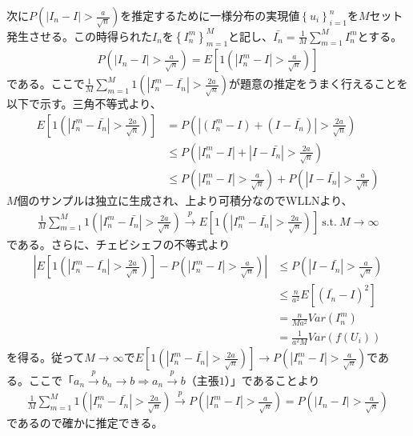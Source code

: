 \documentclass{article}
\begin{document}
次に$P\left( | I_n - I | > \frac{a}{\sqrt{n}} \right)$を推定するために一様分布の実現値$\left\{ u_i \right\}_{i=1}^n$を$M$セット発生させる。この時得られた$I_n$を$\left\{I_n^m\right\}_{m=1}^M$と記し、$\bar{I_n} = \frac{1}{M} \sum_{m=1}^M I_n^m$とする。
\begin{align*}
	P\left( | I_n - I | > \frac{a}{\sqrt{n}} \right) = E\left[ 1\left(  | I_n^m - I | > \frac{a}{\sqrt{n}} \right) \right]
\end{align*}
である。ここで$\frac{1}{M} \sum_{m=1}^M 1\left(  | I_n^m - \bar{I_n} | > \frac{2a}{\sqrt{n}} \right)$が題意の推定をうまく行えることを以下で示す。三角不等式より、
\begin{align*}
	E\left[ 1\left(  | I_n^m - \bar{I_n} | > \frac{2a}{\sqrt{n}} \right) \right] &= P\left( | (I_n^m - I) + (I - \bar{I_n}) |  > \frac{2a}{\sqrt{n}} \right) \\
	&\leq P\left( | I_n^m - I |+ |I - \bar{I_n}|  > \frac{2a}{\sqrt{n}} \right)\\
	& \leq P\left( | I_n^m - I |> \frac{a}{\sqrt{n}} \right) + P\left( |I - \bar{I_n}|  > \frac{a}{\sqrt{n}} \right)
\end{align*}
$M$個のサンプルは独立に生成され、上より可積分なのでWLLNより、
\begin{align*}
\frac{1}{M} \sum_{m=1}^M 1\left(  | I_n^m - \bar{I_n} | > \frac{2a}{\sqrt{n}} \right) \xrightarrow{p} E\left[ 1\left(  | I_n^m - \bar{I_n} | > \frac{2a}{\sqrt{n}} \right) \right]\ \text{s.t.}\ M\to \infty
\end{align*}
である。さらに、チェビシェフの不等式より
\begin{align*}
	\left| E\left[ 1\left(  | I_n^m - \bar{I_n} | > \frac{2a}{\sqrt{n}} \right) \right] - P\left( | I_n^m - I |> \frac{a}{\sqrt{n}} \right)  \right| &\leq P\left( |I - \bar{I_n}|  > \frac{a}{\sqrt{n}} \right)\\
	&\leq \frac{n}{a^2} E\left[ \left( \bar{I_n} - I \right)^2 \right]\\
	&= \frac{n}{Ma^2} Var\left(I_n^m \right)\\
	&= \frac{1}{a^2M} Var\left( f(U_i) \right)
\end{align*}
を得る。従って$M\to \infty$で$E\left[ 1\left(  | I_n^m - \bar{I_n} | > \frac{2a}{\sqrt{n}} \right) \right] \to P\left( | I_n^m - I |> \frac{a}{\sqrt{n}} \right)$である。ここで「$a_n \xrightarrow{p} b_n \to b \Rightarrow a_n \xrightarrow{p} b$（主張$1$）」であることより
\begin{align*}
	\frac{1}{M} \sum_{m=1}^M 1\left(  | I_n^m - \bar{I_n} | > \frac{2a}{\sqrt{n}} \right) \xrightarrow{p} P\left( | I_n^m - I |> \frac{a}{\sqrt{n}} \right) = P\left( | I_n - I |> \frac{a}{\sqrt{n}} \right)
\end{align*}
であるので確かに推定できる。
\end{document}
